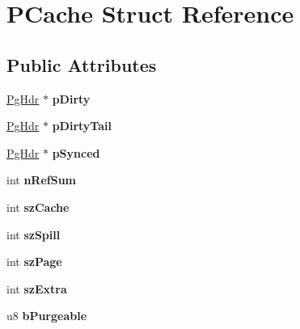 \hypertarget{struct_p_cache}{}\section{P\+Cache Struct Reference}
\label{struct_p_cache}
\subsection*{Public Attributes}
\begin{DoxyCompactItemize}
\item 
\mbox{\label{struct_p_cache_a1c692ce92c7d3fc7c6c1324d5658b252}} 
\mbox{\hyperlink{struct_pg_hdr}{Pg\+Hdr}} $\ast$ {\bfseries p\+Dirty}
\item 
\mbox{\label{struct_p_cache_a8eaca309bfb8fa49e7c5e77dd3398bb0}} 
\mbox{\hyperlink{struct_pg_hdr}{Pg\+Hdr}} $\ast$ {\bfseries p\+Dirty\+Tail}
\item 
\mbox{\label{struct_p_cache_a607eabd6768dd8df47d8fa353542b106}} 
\mbox{\hyperlink{struct_pg_hdr}{Pg\+Hdr}} $\ast$ {\bfseries p\+Synced}
\item 
\mbox{\label{struct_p_cache_a9688476c9cab5a7af8d09860567759eb}} 
int {\bfseries n\+Ref\+Sum}
\item 
\mbox{\label{struct_p_cache_a93ed4b9d731d883c3ed22a5adfd9c636}} 
int {\bfseries sz\+Cache}
\item 
\mbox{\label{struct_p_cache_abd30c4610f4087dad64f75e6c4e1e332}} 
int {\bfseries sz\+Spill}
\item 
\mbox{\label{struct_p_cache_abb0bd0a3292780dcc07cb59bc577990d}} 
int {\bfseries sz\+Page}
\item 
\mbox{\label{struct_p_cache_abcb37fcd3ea098b98a196a3f69e3c135}} 
int {\bfseries sz\+Extra}
\item 
\mbox{\label{struct_p_cache_a87ff1d0738734375524e544cefa33b01}} 
u8 {\bfseries b\+Purgeable}
\item 
\mbox{\label{struct_p_cache_a28629953493154d29ab7b6485a0471bf}} 

\end{DoxyCompactItemize}
